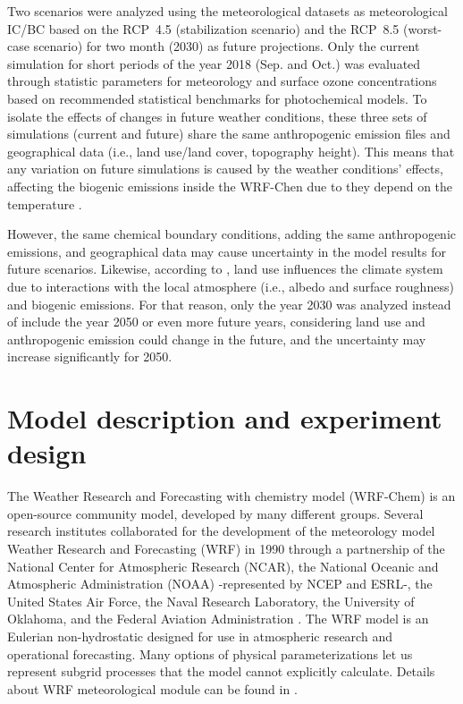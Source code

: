 Two scenarios were analyzed using the meteorological datasets as meteorological IC/BC based on the RCP~4.5 (stabilization scenario) and the RCP~8.5 (worst-case scenario) for two month (2030) as future projections.
Only the current simulation for short periods of the year 2018 (Sep. and Oct.) was evaluated through statistic parameters for meteorology and surface ozone concentrations based on recommended statistical benchmarks for photochemical models.
To isolate the effects of changes in future weather conditions, these three sets of simulations (current and future) share the same anthropogenic emission files and geographical data (i.e., land use/land cover, topography height). This means that any variation on future simulations is caused by the weather conditions' effects, affecting the biogenic emissions inside the WRF-Chen due to they depend on the temperature \citep{Guenther2006}.

However, the same chemical boundary conditions, adding the same anthropogenic emissions, and geographical data may cause uncertainty in the model results for future scenarios.
Likewise, according to \citet{VanVuuren2011a}, land use influences the climate system due to interactions with the local atmosphere (i.e., albedo and surface roughness) and biogenic emissions.
For that reason, only the year 2030 was analyzed instead of include the year 2050 or even more future years, considering land use and anthropogenic emission could change in the future, and the uncertainty may increase significantly for 2050.  

\section{Model description and experiment design}
The Weather Research and Forecasting with chemistry model (WRF-Chem) \citep{Grell2005} is an open-source community model, developed by many different groups.
Several research institutes collaborated for the development of the meteorology model Weather Research and Forecasting (WRF) in 1990 through a partnership of the National Center for Atmospheric Research (NCAR), the National Oceanic and Atmospheric Administration (NOAA) -represented by NCEP and ESRL-, the United States Air Force, the Naval Research Laboratory, the University of Oklahoma, and the Federal Aviation Administration \citep{Skamarock2019}.
The WRF model is an Eulerian non-hydrostatic designed for use in atmospheric research and operational forecasting.
Many options of physical parameterizations let us represent subgrid processes that the model cannot explicitly calculate.
Details about WRF meteorological module can be found in \citet{Skamarock2019}.

